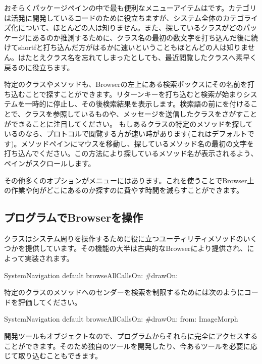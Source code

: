 \documentclass[a4paper,10pt,twoside]{book}
\begin{document}
おそらくパッケージペインの中で最も便利なメニューアイテムはです。カテゴリは活発に開発しているコードのために役立ちますが、システム全体のカテゴライズ化について、ほとんどの人は知りません。また、探しているクラスがどのパッケージにあるのか推測するために、クラス名の最初の数文字を打ち込んだ後に続けてshort{f}と打ち込んだ方がはるかに速いということもほとんどの人は知りません。はたとえクラス名を忘れてしまったとしても、最近閲覧したクラスへ素早く戻るのに役立ちます。

特定のクラスやメソッドも、Browserの左上にある検索ボックスにその名前を打ち込むことで探すことができます。リターンキーを打ち込むと検索が始まりシステムを一時的に停止し、その後検索結果を表示します。検索語の前に\ct{#}を付けることで、クラスを参照しているものや、メッセージを送信したクラスをさがすことができることに注目してください。
もしあるクラスの特定のメソッドを探しているのなら、プロトコルで閲覧する方が速い時があります(これはデフォルトです)。メソッドペインにマウスを移動し、探しているメソッド名の最初の文字を打ち込んでください。この方法により探しているメソッド名が表示されるよう、ペインがスクロールします。


その他多くのオプションがメニューにはあります。これを使うことでBrowser上の作業や何がどこにあるのか探すのに費やす時間を減らすことができます。

\subsection{プログラムでBrowserを操作}

クラスはシステム周りを操作するために役に立つユーティリティメソッドのいくつかを提供しています。その機能の大半は古典的なBrowserにより提供され、によって実装されます。

\begin{code}{}
SystemNavigation default browseAllCallsOn: #drawOn:
\end{code}
特定のクラスのメソッドへのセンダーを検索を制限するためには次のようにコードを評価してください。
\begin{code}{}
SystemNavigation default browseAllCallsOn: #drawOn: from: ImageMorph
\end{code}
開発ツールもオブジェクトなので、プログラムからそれらに完全にアクセスすることができます。そのため独自のツールを開発したり、今あるツールを必要に応じて取り込むこともできます。
\end{document}

